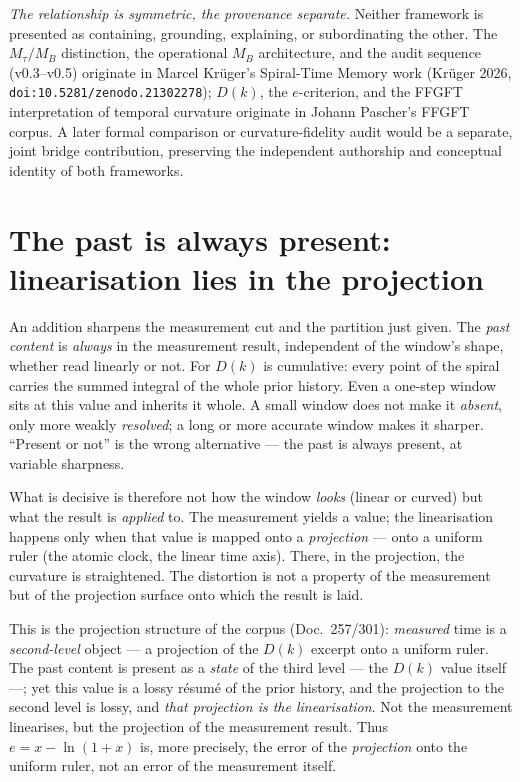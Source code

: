 \emph{The relationship is symmetric, the provenance separate.} Neither framework is presented
as containing, grounding, explaining, or subordinating the other. The $M_\tau/M_B$ distinction,
the operational $M_B$ architecture, and the audit sequence (v0.3--v0.5) originate in Marcel
Krüger's Spiral-Time Memory work (Krüger 2026, \texttt{doi:10.5281/zenodo.21302278}); $D(k)$, the $e$-criterion, and the FFGFT interpretation of
temporal curvature originate in Johann Pascher's FFGFT corpus. A later formal comparison or
curvature-fidelity audit would be a separate, joint bridge contribution, preserving the
independent authorship and conceptual identity of both frameworks.

\section{The past is always present: linearisation lies in the projection}

An addition sharpens the measurement cut and the partition just given. The \emph{past
content} is \emph{always} in the measurement result, independent of the window's shape,
whether read linearly or not. For $D(k)$ is cumulative: every point of the spiral carries the
summed integral of the whole prior history. Even a one-step window sits at
this value and inherits it whole. A small window does not make it \emph{absent}, only more weakly
\emph{resolved}; a long or more accurate window makes it sharper. \enquote{Present or not} is
the wrong alternative --- the past is always present, at variable sharpness.

What is decisive is therefore not how the window \emph{looks} (linear or curved) but what the
result is \emph{applied} to. The measurement yields a value; the linearisation happens only
when that value is mapped onto a \emph{projection} --- onto a uniform ruler (the atomic clock,
the linear time axis). There, in the projection, the curvature is straightened. The distortion
is not a property of the measurement but of the projection surface onto which the result is
laid.

This is the projection structure of the corpus (Doc.~257/301): \emph{measured} time is a
\emph{second-level} object --- a projection of the $D(k)$ excerpt onto a uniform ruler. The
past content is present as a \emph{state} of the third level --- the $D(k)$ value itself ---;
yet this value is a lossy résumé of the prior history, and the projection to the second level
is lossy, and \emph{that projection is the linearisation}. Not
the measurement linearises, but the projection of the measurement result. Thus $e =
x-\ln(1+x)$ is, more precisely, the error of the \emph{projection} onto the uniform ruler, not
an error of the measurement itself.

